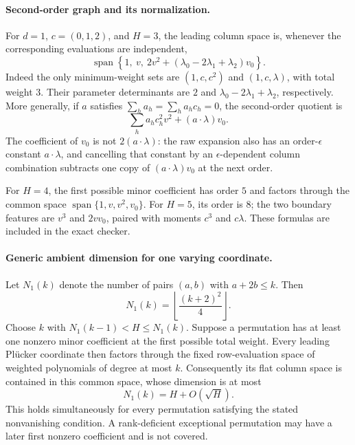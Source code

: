 \documentclass[11pt]{article}
\begin{document}
\paragraph{Second-order graph and its normalization.}
For $d=1$, $c=(0,1,2)$, and $H=3$, the leading column space is, whenever
the corresponding evaluations are independent,
\[
 \operatorname{span}\left\{1,\ v,\
 2v^2+(\lambda_0-2\lambda_1+\lambda_2)v_0\right\}.
 \tag{2}
\]
Indeed the only minimum-weight sets are
$(1,c,c^2)$ and $(1,c,\lambda)$, with total weight $3$.
Their parameter determinants are $2$ and
$\lambda_0-2\lambda_1+\lambda_2$, respectively.
More generally, if $a$ satisfies $\sum_h a_h=\sum_h a_hc_h=0$,
the second-order quotient is
\[
 \sum_h a_hc_h^2v^2+(a\cdot\lambda)v_0.
\]
The coefficient of $v_0$ is not $2(a\cdot\lambda)$: the raw expansion
also has an order-$\epsilon$ constant $a\cdot\lambda$, and cancelling
that constant by an $\epsilon$-dependent column combination subtracts
one copy of $(a\cdot\lambda)v_0$ at the next order.

For $H=4$, the first possible minor coefficient has order $5$ and
factors through the common space $\operatorname{span}\{1,v,v^2,v_0\}$.
For $H=5$, its order is $8$; the two boundary features are $v^3$ and
$2vv_0$, paired with moments $c^3$ and $c\lambda$. These formulas
are included in the exact checker.

\paragraph{Generic ambient dimension for one varying coordinate.}
Let $N_1(k)$ denote the number of pairs $(a,b)$ with $a+2b\leq k$.
Then
\[
 N_1(k)=\left\lfloor\frac{(k+2)^2}{4}\right\rfloor.
\]
Choose $k$ with $N_1(k-1)<H\leq N_1(k)$. Suppose a permutation has
at least one nonzero minor coefficient at the first possible total
weight. Every leading Pl\"ucker coordinate then factors through
the fixed row-evaluation space of weighted polynomials of degree at
most $k$. Consequently its flat column space is contained in this
common space, whose dimension is at most
\[
 N_1(k)=H+O(\sqrt H).
\]
This holds simultaneously for every permutation satisfying the
stated nonvanishing condition. A rank-deficient exceptional permutation
may have a later first nonzero coefficient and is not covered.
\end{document}
